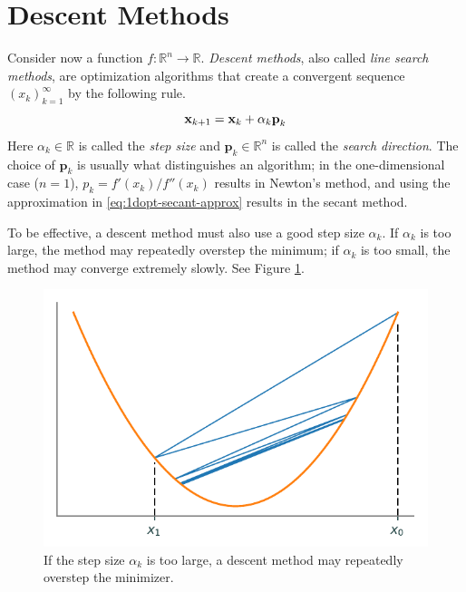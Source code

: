 \section*{Descent Methods} %

Consider now a function $f:\mathbb{R}^n\rightarrow\mathbb{R}$.
\emph{Descent methods}, also called \emph{line search methods}, are optimization algorithms that create a convergent sequence $(x_k)_{k=1}^\infty$ by the following rule.
\begin{equation}
\mathbf{x}_{k+1} = \mathbf{x}_k + \alpha_k \textbf{p}_k
\end{equation}
Here $\alpha_k \in \mathbb{R}$ is called the \emph{step size} and $\textbf{p}_k \in \mathbb{R}^n$ is called the \emph{search direction}.
The choice of $\textbf{p}_k$ is usually what distinguishes an algorithm;
in the one-dimensional case ($n = 1$), $p_k = f'(x_k)/f''(x_k)$ results in Newton's method, and using the approximation in \eqref{eq:1dopt-secant-approx} results in the secant method.

To be effective, a descent method must also use a good step size $\alpha_k$.
If $\alpha_k$  is too large, the method may repeatedly overstep the minimum; if $\alpha_k$ is too small, the method may converge extremely slowly.
See Figure \ref{fig:1dopt-overstep}.

\begin{figure}[H]
    \centering
    \includegraphics[width=.7\textwidth]{figures/large_alpha.pdf}
    \caption{If the step size $\alpha_k$ is too large, a descent method may repeatedly overstep the minimizer.}
    \label{fig:1dopt-overstep}
\end{figure}

